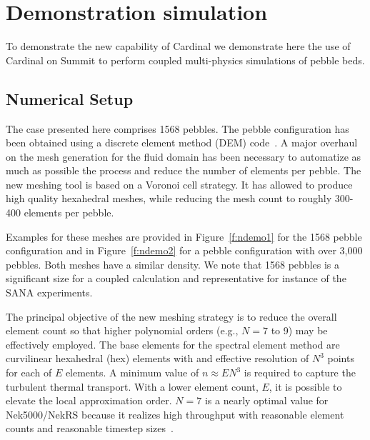 \section{Demonstration simulation}
\label{s:demo}

To demonstrate the new capability of Cardinal we demonstrate here the use of
Cardinal on Summit to perform coupled multi-physics simulations of pebble beds.

\subsection{Numerical Setup}

The case presented here comprises 1568 pebbles. The pebble configuration has
been obtained using a discrete element method (DEM) code~\cite{projectChronoWebSite}. 
A major overhaul on the mesh generation for the fluid domain has been necessary 
to automatize as much as possible the process and reduce the number of elements 
per pebble. The new meshing tool is based on a Voronoi cell strategy. 
It has allowed to produce high quality hexahedral meshes, while reducing the mesh 
count to roughly 300-400 elements per pebble.

Examples for these meshes are provided in Figure~\ref{f:ndemo1} for the 1568
pebble configuration and in Figure~\ref{f:ndemo2} for a pebble configuration
with over 3,000 pebbles. Both meshes have a similar density.
We note that 1568 pebbles is a significant size for a coupled calculation and
representative for instance of the SANA experiments.

The principal objective of the new meshing strategy is to reduce the 
overall element count so that higher polynomial orders (e.g., $N=7$
to 9) may be effectively employed.   The base elements for the 
spectral element method are curvilinear hexahedral (hex) elements
with and effective resolution of $N^3$ points for each of $E$ elements.
A minimum value of $n \approx EN^3$ is required to capture the turbulent
thermal transport.  With a lower element count, $E$, it is possible to
elevate the local approximation order.  $N=7$ is a nearly optimal value
for Nek5000/NekRS because it realizes high throughput with reasonable 
element counts and reasonable timestep sizes~\cite{fischer20a}.

